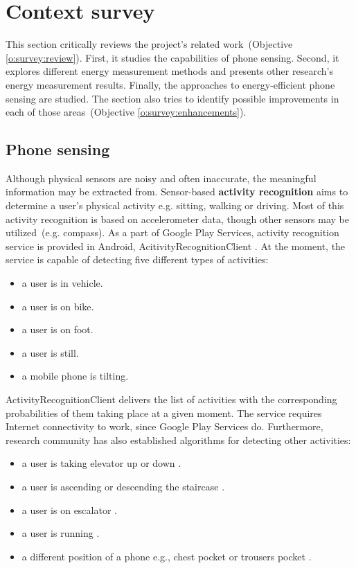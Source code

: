 \section{Context survey}
\label{s:contextsurvey}
\hspace{10pt} This section critically reviews the project's related work\ (Objective \ref{o:survey:review}). First, it studies the capabilities of phone sensing. Second, it explores different energy measurement methods and presents other research's energy measurement results. Finally, the approaches to energy-efficient phone sensing are studied. The section also tries to identify possible improvements in each of those areas\ (Objective \ref{o:survey:enhancements}).

\subsection{Phone sensing}
\hspace{10pt} Although physical sensors are noisy and often inaccurate, the meaningful information may be extracted from. \hspace{10pt} Sensor-based \textbf{activity recognition} aims to determine a user's physical activity e.g. sitting, walking or driving. Most of this activity recognition is based on accelerometer data, though other sensors may be utilized\ (e.g. compass). As a part of Google Play Services, activity recognition service is provided in Android, AcitivityRecognitionClient \cite{android:activityrecognition}. At the moment, the service is capable of detecting five different types of activities: 
 \begin{itemize}
  	\item a user is in vehicle.
    \item a user is on bike.
    \item a user is on foot.
    \item a user is still.
    \item a mobile phone is tilting.
  \end{itemize}
  
ActivityRecognitionClient delivers the list of activities with the corresponding probabilities of them taking place at a given moment. The service requires Internet connectivity to work, since Google Play Services do. Furthermore, research community has also established algorithms for detecting other activities:
 \begin{itemize}
  	\item a user is taking elevator up or down \cite{Wang:unsupervised}.
    \item a user is ascending or descending the staircase \cite{Wang:unsupervised}.
    \item a user is on escalator \cite{Wang:unsupervised}.
    \item a user is running \cite{miluzzo:cenceme}.
    \item a different position of a phone e.g., chest pocket or trousers pocket \cite{kawahara:positions}.
  \end{itemize}


